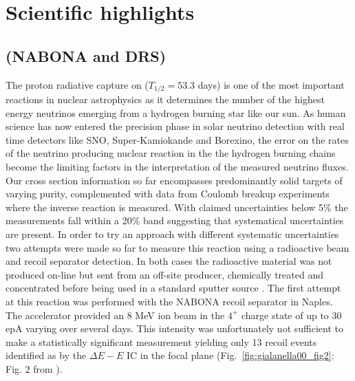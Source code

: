 \section{Scientific highlights}

\subsection{ (NABONA and DRS) }
The proton radiative capture on  ($T_{1/2} = 53.3$ days) is one of the most important reactions in nuclear astrophysics as it determines the number of the highest energy neutrinos emerging from a hydrogen burning star like our sun. As human science has now entered the precision phase in solar neutrino detection with real time detectors like SNO, Super-Kamiokande and Borexino, the error on the rates of the neutrino producing nuclear reaction in the the hydrogen burning chains become the limiting factors in the interpretation of the measured neutrino fluxes. Our cross section information so far encompasses predominantly solid  targets of varying purity, complemented with data from Coulomb breakup experiments where the inverse reaction is measured. With claimed uncertainties below 5\% the measurements fall within a 20\% band suggesting that systematical uncertainties are present. In order to try an approach with different systematic uncertainties two attempts were made so far to measure this reaction using a radioactive beam and recoil separator detection. In both cases the radioactive material was not produced on-line but sent from an off-site producer, chemically treated and concentrated before being used in a standard sputter source \cite{gial00}. The first attempt at this reaction was performed with the NABONA recoil separator in Naples. The accelerator provided an 8 MeV  ion beam in the $4^+$ charge state of up to 30 epA varying over several days. This intensity was unfortunately not sufficient to make a statistically significant measurement yielding only 13 recoil events identified as  by the $\Delta{}E-E$ IC in the focal plane (Fig.\ \ref{fig:gialanella00_fig2}: Fig. 2 from \cite{gial00}).
